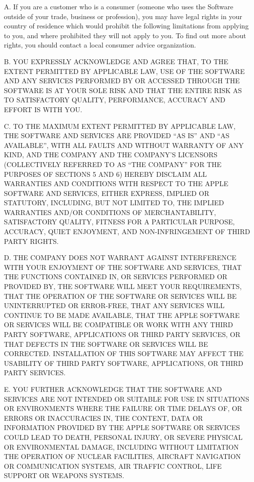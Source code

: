 \documentclass[letterpaper,12pt]{article}
\begin{document}
{A. If you are a customer who is a consumer (someone who uses the Software outside of your trade, business or profession), you may have legal rights in your country of residence which would prohibit the following limitations from applying to you, and where prohibited they will not apply to you. To find out more about rights, you should contact a local consumer advice organization. 

B. YOU EXPRESSLY ACKNOWLEDGE AND AGREE THAT, TO THE EXTENT PERMITTED BY APPLICABLE LAW, USE OF THE SOFTWARE AND ANY SERVICES PERFORMED BY OR ACCESSED THROUGH THE SOFTWARE IS AT YOUR SOLE RISK AND THAT THE ENTIRE RISK AS TO SATISFACTORY QUALITY, PERFORMANCE, ACCURACY AND EFFORT IS WITH YOU. 

C. TO THE MAXIMUM EXTENT PERMITTED BY APPLICABLE LAW, THE SOFTWARE AND SERVICES ARE PROVIDED ``AS IS'' AND ``AS AVAILABLE'', WITH ALL FAULTS AND WITHOUT WARRANTY OF ANY KIND, AND THE COMPANY AND THE COMPANY'S LICENSORS (COLLECTIVELY REFERRED TO AS ``THE COMPANY'' FOR THE PURPOSES OF SECTIONS 5 AND 6) HEREBY DISCLAIM ALL WARRANTIES AND CONDITIONS WITH RESPECT TO THE APPLE SOFTWARE AND SERVICES, EITHER EXPRESS, IMPLIED OR STATUTORY, INCLUDING, BUT NOT LIMITED TO, THE IMPLIED WARRANTIES AND/OR CONDITIONS OF MERCHANTABILITY, SATISFACTORY QUALITY, FITNESS FOR A PARTICULAR PURPOSE, ACCURACY, QUIET ENJOYMENT, AND NON-INFRINGEMENT OF THIRD PARTY RIGHTS. 

D. THE COMPANY DOES NOT WARRANT AGAINST INTERFERENCE WITH YOUR ENJOYMENT OF THE SOFTWARE AND SERVICES, THAT THE FUNCTIONS CONTAINED IN, OR SERVICES PERFORMED OR PROVIDED BY, THE SOFTWARE WILL MEET YOUR REQUIREMENTS, THAT THE OPERATION OF THE SOFTWARE OR SERVICES WILL BE UNINTERRUPTED OR ERROR-FREE, THAT ANY SERVICES WILL CONTINUE TO BE MADE AVAILABLE, THAT THE APPLE SOFTWARE OR SERVICES WILL BE COMPATIBLE OR WORK WITH ANY THIRD PARTY SOFTWARE, APPLICATIONS OR THIRD PARTY SERVICES, OR THAT DEFECTS IN THE SOFTWARE OR SERVICES WILL BE CORRECTED. INSTALLATION OF THIS SOFTWARE MAY AFFECT THE USABILITY OF THIRD PARTY SOFTWARE, APPLICATIONS, OR THIRD PARTY SERVICES. 

E. YOU FURTHER ACKNOWLEDGE THAT THE SOFTWARE AND SERVICES ARE NOT INTENDED OR SUITABLE FOR USE IN SITUATIONS OR ENVIRONMENTS WHERE THE FAILURE OR TIME DELAYS OF, OR ERRORS OR INACCURACIES IN, THE CONTENT, DATA OR INFORMATION PROVIDED BY THE APPLE SOFTWARE OR SERVICES COULD LEAD TO DEATH, PERSONAL INJURY, OR SEVERE PHYSICAL OR ENVIRONMENTAL DAMAGE, INCLUDING WITHOUT LIMITATION THE OPERATION OF NUCLEAR FACILITIES, AIRCRAFT NAVIGATION OR COMMUNICATION SYSTEMS, AIR TRAFFIC CONTROL, LIFE SUPPORT OR WEAPONS SYSTEMS. 

}
\end{document}
